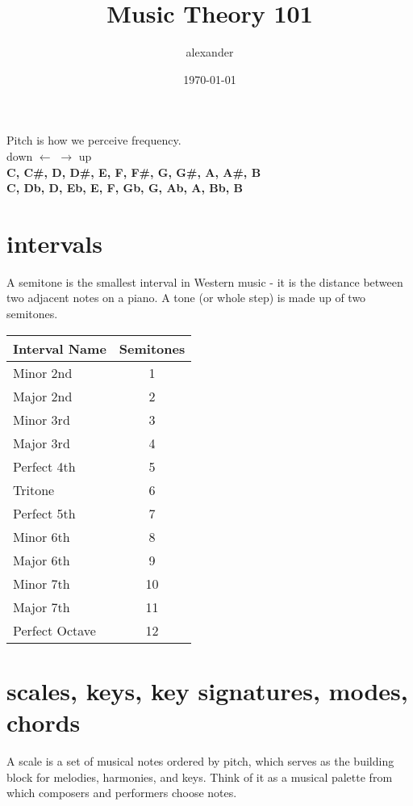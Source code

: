 \documentclass{article}
\title{Music Theory 101}
\author{alexander}
\date{\today}
\begin{document}
\maketitle

Pitch is how we perceive frequency.\\

down $\leftarrow$ $\rightarrow$ up\\
\textbf{C, C\#, D, D\#, E, F, F\#, G, G\#, A, A\#, B}\\
\textbf{C, Db, D, Eb, E, F, Gb, G, Ab, A, Bb, B}\\

\section*{intervals}

A semitone is the smallest interval in Western music - it is the distance between two adjacent notes on a piano. A tone (or whole step) is made up of two semitones.

\begin{table}[h!]
\centering
\begin{tabular}{|l|c|}
\hline
\textbf{Interval Name} & \textbf{Semitones} \\
\hline
Minor 2nd       & 1  \\
Major 2nd       & 2  \\
Minor 3rd       & 3  \\
Major 3rd       & 4  \\
Perfect 4th     & 5  \\
Tritone         & 6  \\
Perfect 5th     & 7  \\
Minor 6th       & 8  \\
Major 6th       & 9  \\
Minor 7th       & 10 \\
Major 7th       & 11 \\
Perfect Octave  & 12 \\
\hline
\end{tabular}
\end{table}

\section*{scales, keys, key signatures, modes, chords}

A scale is a set of musical notes ordered by pitch, which serves as the building block for melodies, harmonies, and keys. Think of it as a musical palette from which composers and performers choose notes.\\
\end{document}
